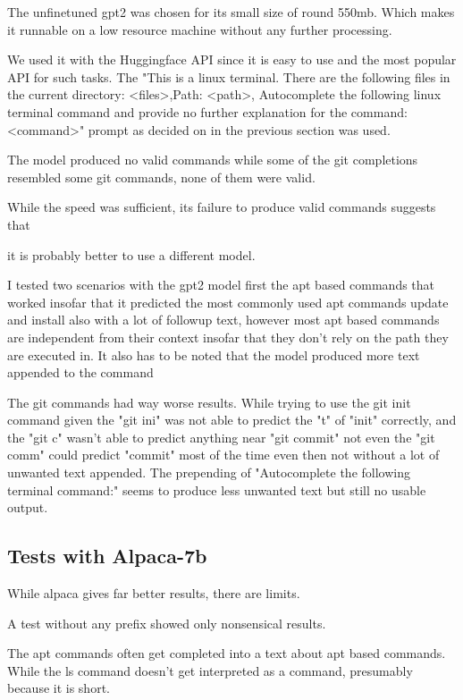 The unfinetuned gpt2 was chosen for its small size of round 550mb. Which makes it runnable on a low resource machine without any further processing. 

We used it with the Huggingface API since it is easy to use and the most popular API for such tasks. The "This is a linux terminal. There are the following files in the current  directory: <files>,Path: <path>, Autocomplete the following linux terminal command and provide no further explanation for the command: <command>" prompt as decided on in the previous section was used.


The model produced no valid commands while some of the git  completions resembled some git commands, none of them were valid.

While the speed was sufficient, its failure to produce valid commands suggests that

it is probably better to use a different model. 





I tested two scenarios with the gpt2 model first the apt based commands that worked insofar that it predicted the most commonly used apt commands update and install also with a lot of followup text, however most apt based commands are independent from their context insofar that they don't rely on the path they are executed in. It also has to be noted that the model produced more text appended to the command 


The git commands had way worse results. While trying to use the git  init command given the "git ini" was not able to predict the "t" of "init" correctly, and the "git c" wasn't able to predict anything near "git commit" not even  the "git comm" could predict "commit" most of the time even then not without a lot of unwanted text appended. The prepending of "Autocomplete the following terminal command:" seems to produce less unwanted text but still no usable output. 

\subsection{Tests with Alpaca-7b}
While alpaca gives far better results, there are limits.


A test without any prefix showed only nonsensical results.

The apt commands often get completed into a text about apt based commands. While the ls command doesn't get interpreted as a command, presumably because it is short.


